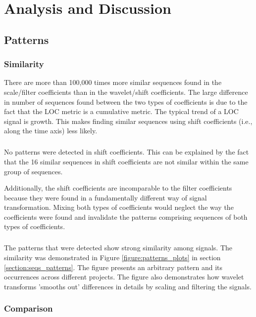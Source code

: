 \chapter{Analysis and Discussion}
\label{analysis}

\section{Patterns}
\subsection{Similarity}
There are more than 100,000 times more similar sequences found in the
scale/filter coefficients than in the wavelet/shift coefficients. The large
difference in number of sequences found between the two types of coefficients
is due to the fact that the LOC metric is a cumulative metric. The typical
trend of a LOC signal is growth. This makes finding similar sequences using
shift coefficients (i.e., along the time axis) less likely.

\paragraph{}
No patterns were detected in shift coefficients. This can be explained by the
fact that the 16 similar sequences in shift coefficients are not similar within
the same group of sequences.

Additionally, the shift coefficients are incomparable to the filter coefficients
because they were found in a fundamentally different way of signal
transformation. Mixing both types of coefficients would neglect the way the
coefficients were found and invalidate the patterns comprising sequences of
both types of coefficients.

\paragraph{}
The patterns that were detected show strong similarity among signals. The
similarity was demonstrated in Figure \ref{figure:patterns_plots} in section
\ref{section:seqs_patterns}. The figure presents an arbitrary pattern and its
occurrences across different projects. The figure also demonstrates how wavelet
transforms 'smooths out' differences in details by scaling and filtering the
signals.

\subsection{Comparison}

